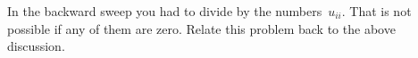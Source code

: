   In the backward sweep you had to divide by the
  numbers~$u_{ii}$. That is not possible if any of them are zero.
  Relate this problem back to the above discussion.
